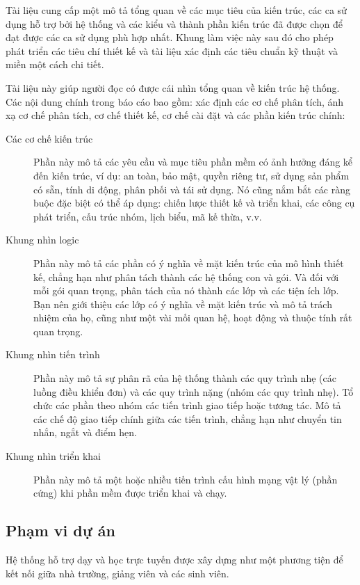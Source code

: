 \documentclass[./../main_file.tex]{subfiles}
\begin{document}
Tài liệu cung cấp một mô tả tổng quan về các mục tiêu của kiến trúc, các ca sử dụng hỗ trợ bởi hệ thống và các kiểu và thành phần kiến trúc đã được chọn để đạt được các ca sử dụng phù hợp nhất. Khung làm việc này sau đó cho phép phát triển các tiêu chí thiết kế và tài liệu xác định các tiêu chuẩn kỹ thuật và miền một cách chi tiết.


Tài liệu này giúp người đọc có được cái nhìn tổng quan về kiến trúc hệ thống. Các nội dung chính trong báo cáo bao gồm: xác định các cơ chế phân tích, ánh xạ cơ chế phân tích, cơ chế thiết kế, cơ chế cài đặt và các phần kiến trúc chính:

\begin{description}
	\item[Các cơ chế kiến trúc] Phần này mô tả các yêu cầu và mục tiêu phần mềm có ảnh hưởng đáng kể đến kiến trúc, ví dụ: an toàn, bảo mật, quyền riêng tư, sử dụng sản phẩm có sẵn, tính di động, phân phối và tái sử dụng. Nó cũng nắm bắt các ràng buộc đặc biệt có thể áp dụng: chiến lược thiết kế và triển khai, các công cụ phát triển, cấu trúc nhóm, lịch biểu, mã kế thừa, v.v.
	\item[Khung nhìn logic] Phần này mô tả các phần có ý nghĩa về mặt kiến trúc của mô hình thiết kế, chẳng hạn như phân tách thành các hệ thống con và gói. Và đối với mỗi gói quan trọng, phân tách của nó thành các lớp và các tiện ích lớp. Bạn nên giới thiệu các lớp có ý nghĩa về mặt kiến trúc và mô tả trách nhiệm của họ, cũng như một vài mối quan hệ, hoạt động và thuộc tính rất quan trọng.
	\item[Khung nhìn tiến trình] Phần này mô tả sự phân rã của hệ thống thành các quy trình nhẹ (các luồng điều khiển đơn) và các quy trình nặng (nhóm các quy trình nhẹ). Tổ chức các phần theo nhóm các tiến trình giao tiếp hoặc tương tác. Mô tả các chế độ giao tiếp chính giữa các tiến trình, chẳng hạn như chuyển tin nhắn, ngắt và điểm hẹn.
	\item[Khung nhìn triển khai] Phần này mô tả một hoặc nhiều tiến trình cấu hình mạng vật lý (phần cứng) khi phần mềm được triển khai và chạy.
	
\end{description}

\subsection{Phạm vi dự án}

Hệ thống hỗ trợ dạy và học trực tuyến được xây dựng như một phương tiện để kết nối giữa nhà trường, giảng viên và các sinh viên. 
\end{document}

